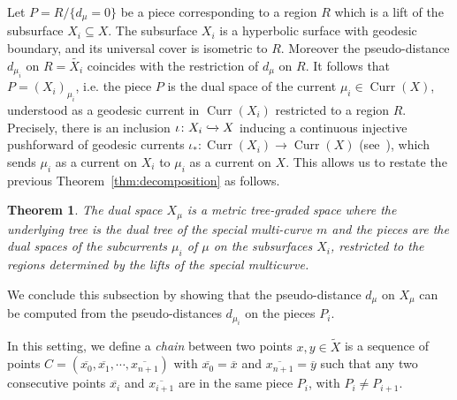 \documentclass[12pt,article]{amsart}
\numberwithin{equation}{section}
\numberwithin{figure}{section}
\newtheorem{theorem}[equation]{Theorem}
\theoremstyle{definition}
\theoremstyle{plain}
\DeclareMathOperator{\Curr}{Curr}
\newcommand*{\wt}[1]{\widetilde{#1}}
\begin{document}
Let $P = R / {\{ d_\mu = 0 \}}$ be a piece corresponding to a region $R$ which is a lift of the subsurface $X_i \subseteq X$. The subsurface $X_i$ is a hyperbolic surface with geodesic boundary, and its universal cover is isometric to $R$. Moreover the pseudo-distance $d_{\mu_i}$ on $R = \wt{X_i}$ coincides with the restriction of $d_\mu$ on $R$. It follows that $P = (X_i)_{\mu_i}$, i.e. the piece $P$ is the dual space of the current $\mu_i \in \Curr(X)$, understood as a geodesic current in $\Curr(X_i)$ restricted to a region $R$. Precisely, there is an inclusion $\iota \colon X_i \xhookrightarrow{} X$ inducing a continuous injective pushforward of geodesic currents $\iota_* \colon \Curr(X_i) \to \Curr(X)$ (see~\cite[Section~4.2]{EM18:ErgodicGeodesicCurrents}), which sends $\mu_i$ as a current on $X_i$ to $\mu_i$ as a current on $X$. 
This allows us to restate the previous Theorem~\ref{thm:decomposition} as follows.

\begin{theorem}
The dual space $X_\mu$ is a metric tree-graded space where the underlying tree is the dual tree of the special multi-curve $m$ and the pieces are the dual spaces of the subcurrents $\mu_i$ of $\mu$ on the subsurfaces $X_i$, restricted to the regions determined by the lifts of the special multicurve. \label{thm:metric_tree_graded}
\end{theorem}



We conclude this subsection by showing that the pseudo-distance $d_\mu$ on $X_\mu$ can be computed from the pseudo-distances $d_{\mu_i}$ on the pieces $P_i$.

In this setting, we define a \emph{chain} between two points $x, y \in \wt{X}$ is a sequence of points $C = (\overline{x_0}, \overline{x_1} , \cdots ,\overline{x_{n+1}} )$ with $\overline{x_0} = \overline{x}$ and $\overline{x_{n+1}} = \overline{y}$ such that any two consecutive points $\overline{x_i}$ and $\overline{x_{i+1}}$ are in the same piece $P_i$, with $P_i \neq P_{i+1}$.
\end{document}

